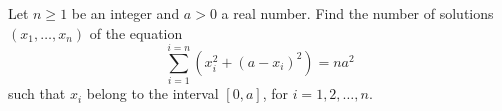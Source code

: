 \documentclass[varwidth]{standalone}
\begin{document}
    Let $n \geq 1$ be an integer and $a > 0$ a real number. Find the number of solutions $(x_1, \dots, x_n)$ of the equation
    \[
        \sum_{i = 1}^{i = n} \left(x_i^2 + (a - x_i)^2 \right) = na^2  
    \]
    such that $x_i$ belong to the interval $[0, a]$, for $i = 1, 2, \dots, n$.
\end{document}
